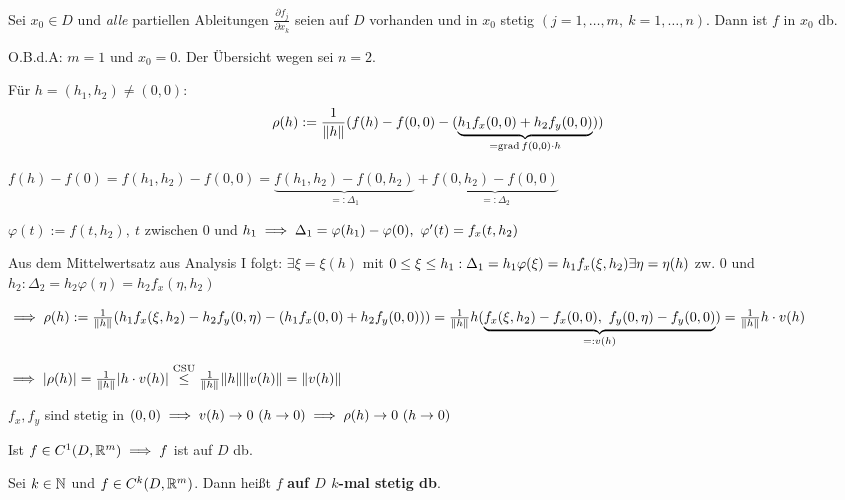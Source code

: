 \documentclass[a4paper,oneside,DIV15,BCOR12mm,chapterprefix=true,headings=onelinechapter]{scrbook}
\begin{document}
\begin{satz}
Sei $x_0 \in D$ und \emph{alle} partiellen Ableitungen $\frac{\partial f_j}{\partial x_k}$ seien auf $D$ vorhanden und in $x_0$ stetig $(j=1,\ldots,m,\ k=1,\ldots,n)$. Dann ist $f$ in $x_0$ db.
\end{satz}

\begin{beweis}
O.B.d.A: $m=1$ und $x_0=0$. Der Übersicht wegen sei $n=2$.

Für $h = (h_1,h_2) \ne (0,0):$ $$\rho(h) := \frac{1}{\|h\|}(f(h) - f(0,0) - (\underbrace{h_1 f_x(0,0) + h_2 f_y(0,0)}_{= \mathop{\rm grad}\nolimits f(0,0)\cdot h}))$$

$f(h) - f(0) = f(h_1,h_2) - f(0,0) = \underbrace{f(h_1,h_2) - f(0,h_2)}_{=:\Delta_1} + \underbrace{f(0,h_2) - f(0,0)}_{=:\Delta_2}$

$\varphi(t) := f(t,h_2),\ t$ zwischen $0$ und $h_1 \implies \Delta_1 = \varphi(h_1) - \varphi(0),\ \varphi'(t) = f_x(t,h_2)$

Aus dem Mittelwertsatz aus Analysis I folgt:
$\exists \xi = \xi(h)$ mit $0 \leq \xi \leq h_1: \Delta_1 = h_1\varphi(\xi) = h_1 f_x(\xi,h_2)\\
\exists \eta = \eta(h)$ zw. $0$ und $h_2: \Delta_2 = h_2\varphi(\eta) = h_2 f_x(\eta,h_2)$

$\implies \rho(h) := \frac{1}{\|h\|}(h_1 f_x(\xi,h_2) - h_2 f_y(0,\eta) - (h_1 f_x(0,0) + h_2 f_y(0,0)))\\
= \frac{1}{\|h\|} h(\underbrace{f_x(\xi,h_2) - f_x(0,0),\ f_y(0,\eta) - f_y(0,0)}_{=:v(h)})
= \frac{1}{\|h\|} h\cdot v(h)$

$\implies |\rho(h)| = \frac{1}{\|h\|} |h\cdot v(h)| \overset{\text{CSU}}{\le} \frac{1}{\|h\|} \|h\| \|v(h)\| = \|v(h)\|$

$f_x,f_y$ sind stetig in $(0,0) \implies v(h) \to 0\ (h \to 0) \implies \rho(h) \to 0\ (h \to 0)$
\end{beweis}

\begin{folgerung}
Ist $f \in C^1(D,\mathbb{R}^m) \implies f$ ist auf $D$ db.
\end{folgerung}

\begin{definition*}
Sei $k \in \mathbb{N}$ und $f \in C^k(D,\mathbb{R}^m)$. Dann heißt $f$ \textbf{auf $D$ $k$-mal stetig db}.
\end{definition*}
\end{document}
